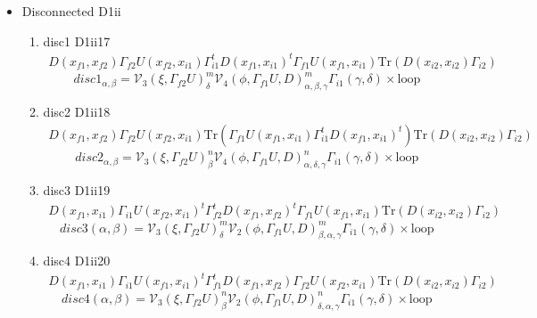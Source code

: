\documentclass{article}[12pt]
\begin{document}
\begin{itemize}
\begin{enumerate}
$$$$
\end{enumerate}
\item Disconnected D1ii
\begin{enumerate}
\item disc1 D1ii17
\begin{eqnarray}
D(x_{f1},x_{f2})\Gamma_{f2}U(x_{f2},x_{i1})\Gamma_{i1}^tD\left(x_{f1},x_{i1}\right)^t\Gamma_{f1}U\left(x_{f1},x_{i1}\right)\mathrm{Tr}\left(D\left(x_{i2},x_{i2}\right)\Gamma_{i2}\right)
\end{eqnarray}
$$
disc1_{\alpha,\beta}={\mathcal V}_{3}\left(\xi,\Gamma_{f2}U\right)_{\delta}^{m}{\mathcal V}_4\left(\phi,\Gamma_{f1}U,D\right)_{\alpha,\beta,\gamma}^m\Gamma_{i1}\left(\gamma,\delta\right)\times \mathrm{loop}
$$
\item disc2 D1ii18
\begin{eqnarray}
D(x_{f1},x_{f2})\Gamma_{f2}U(x_{f2},x_{i1})\mathrm{Tr}\left(\Gamma_{f1}U\left(x_{f1},x_{i1}\right)\Gamma_{i1}^tD\left(x_{f1},x_{i1}\right)^t\right)\mathrm{Tr}\left(D\left(x_{i2},x_{i2}\right)\Gamma_{i2}\right)\
\end{eqnarray}
$$
disc2_{\alpha,\beta}={\mathcal V}_{3}\left(\xi,\Gamma_{f2}U\right)_{\beta}^{n}{\mathcal V}_4\left(\phi,\Gamma_{f1}U,D\right)_{\alpha,\delta,\gamma}^n\Gamma_{i1}\left(\gamma,\delta\right)\times \mathrm{loop}
$$
\item disc3 D1ii19
\begin{eqnarray}
D(x_{f1},x_{i1})\Gamma_{i1}U(x_{f2},x_{i1})^t\Gamma_{f2}^tD\left(x_{f1},x_{f2}\right)^t\Gamma_{f1}U\left(x_{f1},x_{i1}\right)\mathrm{Tr}\left(D\left(x_{i2},x_{i2}\right)\Gamma_{i2}\right)
\end{eqnarray}
$$
disc3\left(\alpha,\beta\right)={\mathcal V}_{3}\left(\xi,\Gamma_{f2}U\right)_{\delta}^{m}{\mathcal V}_2\left(\phi,\Gamma_{f1}U,D\right)_{\beta,\alpha,\gamma}^m\Gamma_{i1}\left(\gamma,\delta\right)\times \mathrm{loop}
$$
\item disc4 D1ii20
\begin{eqnarray}
D(x_{f1},x_{i1})\Gamma_{i1}U(x_{f1},x_{i1})^t\Gamma_{f1}^tD\left(x_{f1},x_{f2}\right)\Gamma_{f2}U\left(x_{f2},x_{i1}\right)\mathrm{Tr}\left(D\left(x_{i2},x_{i2}\right)\Gamma_{i2}\right)
\end{eqnarray}
$$
disc4\left(\alpha,\beta\right)={\mathcal V}_{3}\left(\xi,\Gamma_{f2}U\right)_{\beta}^{n}{\mathcal V}_2\left(\phi,\Gamma_{f1}U,D\right)_{\delta,\alpha,\gamma}^n\Gamma_{i1}\left(\gamma,\delta\right)\times \mathrm{loop}
$$
\end{enumerate}
\end{itemize}
\end{document}
